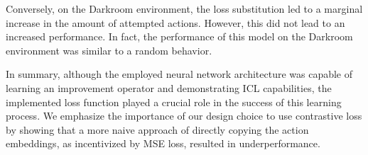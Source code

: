 Conversely, on the Darkroom environment, the loss substitution led to a marginal increase in the amount of attempted actions. However, this did not lead to an increased performance. In fact, the performance of this model on the Darkroom environment was similar to a random behavior. 

In summary, although the employed neural network architecture was capable of learning an improvement operator and demonstrating ICL capabilities, the implemented loss function played a crucial role in the success of this learning process. We emphasize the importance of our design choice to use contrastive loss by showing that a more naive approach of directly copying the action embeddings, as incentivized by MSE loss, resulted in underperformance.




